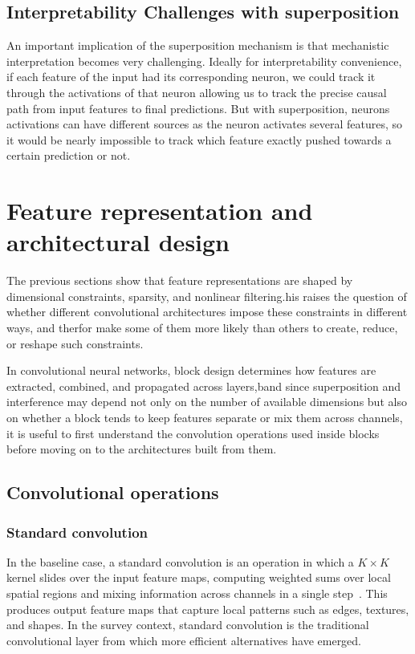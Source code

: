 \documentclass[12pt,a4paper]{report}
\begin{document}
\subsection{Interpretability Challenges with superposition }

An important implication of the superposition mechanism is that mechanistic interpretation becomes very challenging. Ideally for interpretability convenience, if each feature of the input had its corresponding neuron, we could track it through the activations of that neuron allowing us to track the precise causal path from input features to final predictions. But with superposition, neurons activations can have different sources as the neuron activates several features, so it would be nearly impossible to track which feature exactly pushed towards a certain prediction or not. 


\section{Feature representation and architectural design}
The previous sections show that feature representations are shaped by dimensional constraints, sparsity, and nonlinear filtering.his raises the question of whether different convolutional architectures impose these constraints in different ways, and therfor make some of them more likely than others to create, reduce, or reshape such constraints.

In convolutional neural networks, block design determines how features are extracted, combined, and propagated across layers,band since superposition and interference may depend not only on the number of available dimensions but also on whether a block tends to keep features separate or mix them across channels, it is useful to first understand the convolution operations used inside blocks before moving on to the architectures built from them.

\subsection{Convolutional operations}

\subsubsection{Standard convolution}
In the baseline case, a standard convolution is an operation in which a \(K \times K\) kernel slides over the input feature maps, computing weighted sums over local spatial regions and mixing information across channels in a single step~\cite{younesi2024}. This produces output feature maps that capture local patterns such as edges, textures, and shapes. In the survey context, standard convolution is the traditional convolutional layer from which more efficient alternatives have emerged.
\end{document}
